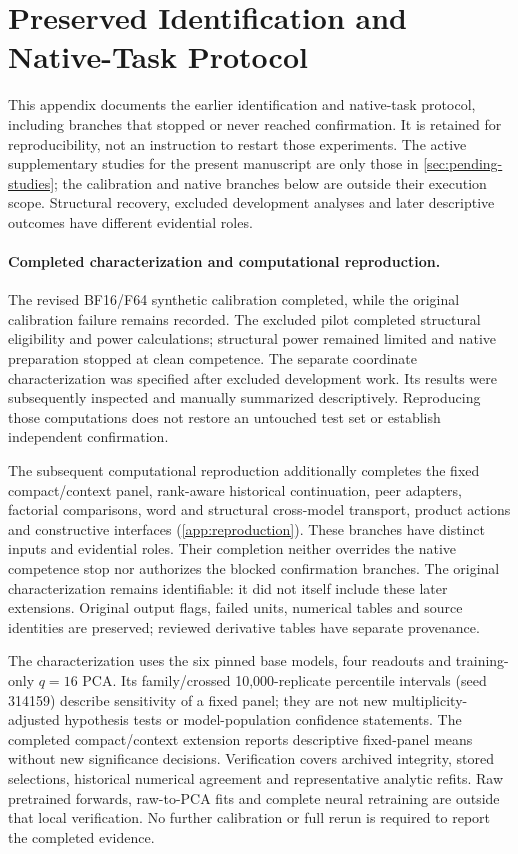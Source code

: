 \section{Preserved Identification and Native-Task Protocol}
\label{app:prospective}
This appendix documents the earlier identification and native-task protocol, including branches that stopped or never reached confirmation. It is retained for reproducibility, not an instruction to restart those experiments. The active supplementary studies for the present manuscript are only those in \cref{sec:pending-studies}; the calibration and native branches below are outside their execution scope. Structural recovery, excluded development analyses and later descriptive outcomes have different evidential roles.

\paragraph{Completed characterization and computational reproduction.}
The revised BF16/F64 synthetic calibration completed, while the original calibration failure remains recorded. The excluded pilot completed structural eligibility and power calculations; structural power remained limited and native preparation stopped at clean competence. The separate coordinate characterization was specified after excluded development work. Its results were subsequently inspected and manually summarized descriptively. Reproducing those computations does not restore an untouched test set or establish independent confirmation.

The subsequent computational reproduction additionally completes the fixed compact/context panel, rank-aware historical continuation, peer adapters, factorial comparisons, word and structural cross-model transport, product actions and constructive interfaces (\cref{app:reproduction}). These branches have distinct inputs and evidential roles. Their completion neither overrides the native competence stop nor authorizes the blocked confirmation branches. The original characterization remains identifiable: it did not itself include these later extensions. Original output flags, failed units, numerical tables and source identities are preserved; reviewed derivative tables have separate provenance.

The characterization uses the six pinned base models, four readouts and training-only $q=16$ PCA. Its family/crossed 10,000-replicate percentile intervals (seed 314159) describe sensitivity of a fixed panel; they are not new multiplicity-adjusted hypothesis tests or model-population confidence statements. The completed compact/context extension reports descriptive fixed-panel means without new significance decisions. Verification covers archived integrity, stored selections, historical numerical agreement and representative analytic refits. Raw pretrained forwards, raw-to-PCA fits and complete neural retraining are outside that local verification. No further calibration or full rerun is required to report the completed evidence.

